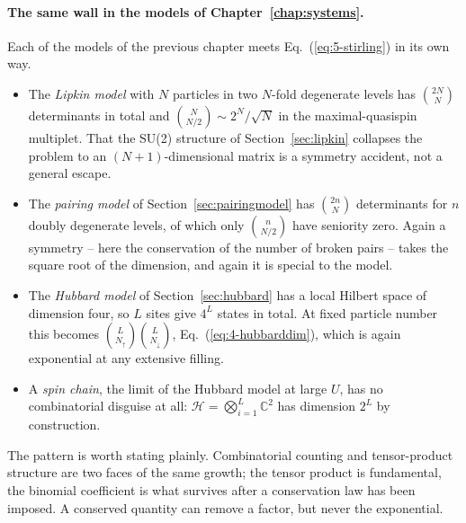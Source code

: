\paragraph{The same wall in the models of Chapter~\ref{chap:systems}.}
Each of the models of the previous chapter meets Eq.~(\ref{eq:5-stirling}) in
its own way.
\begin{itemize}
  \item The \emph{Lipkin model} with $N$ particles in two $N$-fold degenerate
    levels has $\binom{2N}{N}$ determinants in total and $\binom{N}{N/2}\sim
    2^{N}/\sqrt{N}$ in the maximal-quasispin multiplet.  That the SU(2)
    structure of Section~\ref{sec:lipkin} collapses the problem to an
    $(N+1)$-dimensional matrix is a symmetry accident, not a general escape.
  \item The \emph{pairing model} of Section~\ref{sec:pairingmodel} has
    $\binom{2n}{N}$ determinants for $n$ doubly degenerate levels, of which
    only $\binom{n}{N/2}$ have seniority zero.  Again a symmetry -- here the
    conservation of the number of broken pairs -- takes the square root of
    the dimension, and again it is special to the model.
  \item The \emph{Hubbard model} of Section~\ref{sec:hubbard} has a local
    Hilbert space of dimension four, so $L$ sites give $4^{L}$ states in
    total.  At fixed particle number this becomes
    $\binom{L}{N_{\uparrow}}\binom{L}{N_{\downarrow}}$,
    Eq.~(\ref{eq:4-hubbarddim}), which is again exponential at any extensive
    filling.
  \item A \emph{spin chain}, the limit of the Hubbard model at large $U$, has
    no combinatorial disguise at all:
    $\mathcal{H}=\bigotimes_{i=1}^{L}\mathbb{C}^2$ has dimension $2^{L}$ by
    construction.
\end{itemize}
The pattern is worth stating plainly.  Combinatorial counting and
tensor-product structure are two faces of the same growth; the tensor product
is fundamental, the binomial coefficient is what survives after a conservation
law has been imposed.  A conserved quantity can remove a factor, but never the
exponential.

